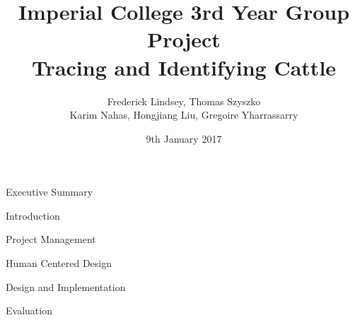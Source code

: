 \documentclass[twoside, a4paper, titlepage]{article}
\title{
  \vspace{2in}
  \textmd{\textbf{
    Imperial College 3rd Year Group Project \\
    Tracing and Identifying Cattle
  }}
  \vspace{3in}
}
\author{
	Frederick Lindsey, Thomas Szyszko \\
	Karim Nahas, Hongjiang Liu, Gregoire Yharrassarry
}
\date{9th January 2017}
\begin{document}
\maketitle


\tableofcontents
\newpage


\begin{section}{Executive Summary}

\end{section}

\newpage
\begin{section}{Introduction}

\end{section}

\newpage
\begin{section}{Project Management}

\end{section}

\newpage
\begin{section}{Human Centered Design}

\end{section}

\newpage
\begin{section}{Design and Implementation}

\end{section}

\newpage
\begin{section}{Evaluation}

\end{section}
\end{document}
